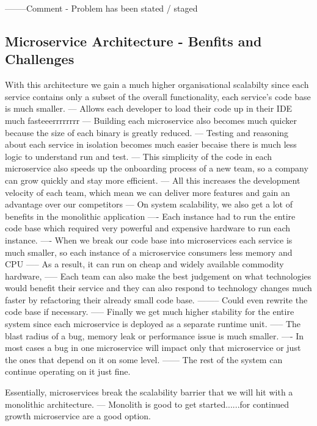 \documentclass[a4paper, 11pt]{book}
\begin{document}
    --------Comment - Problem has been stated / staged

    \subsection{Microservice Architecture - Benfits and Challenges}
    With this architecture we gain a much higher organisational scalabilty since each service contains only a subset of the overall functionality, each service's code base is much smaller.
    --- Allows each developer to load their code up in their IDE much fasteeerrrrrrrr
    --- Building each microservice also becomes much quicker because the size of each binary is greatly reduced.
    --- Testing and reasoning about each service in isolation becomes much easier becaise there is much less logic to understand run and test.
    --- This simplicity of the code in each microservice also speeds up the onboarding process of a new team, so a company can grow quickly and stay more efficient.
    --- All this increases the development velocity of each team, which mean we can deliver more features and gain an advantage over our competitors
    --- On system scalability, we also get a lot of benefits in the monolithic application
    ---- Each instance had to run the entire code base which required very powerful and expensive hardware to run each instance.
    ---- When we break our code base into microservices each service is much smaller, so each instance of a microservice consumers less memory and CPU
    ----- As a result, it can run on cheap and widely available commodity hardware,
    ----- Each team can also make the best judgement on what technologies would benefit their service and they can also respond to technology changes much faster by refactoring their already small code base.
    -------- Could even rewrite the code base if necessary.
    ----- Finally we get much higher stability for the entire system since each microservice is deployed as a separate runtime unit.
    ----- The blast radius of a bug, memory leak or performance issue is much smaller.
    ---- In most cases a bug in one microservice will impact only that microservice or just the ones that depend on it on some level.
    ------ The rest of the system can continue operating on it just fine.

    Essentially, microservices break the scalability barrier that we will hit with a monolithic architecture.
    --- Monolith is good to get started......for continued growth microservice are a good option.
\end{document}
